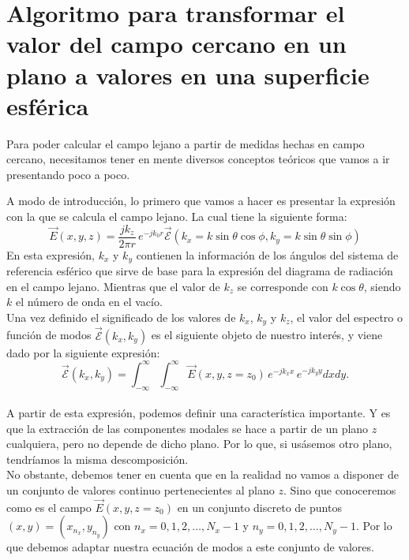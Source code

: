 \documentclass{article}
\begin{document}
\section{Algoritmo para transformar el valor del campo cercano en un
plano a valores en una superficie esférica}

Para poder calcular el campo lejano a partir de medidas hechas en campo cercano, necesitamos tener en mente diversos conceptos teóricos que vamos a ir presentando poco a poco.

A modo de introducción, lo primero que vamos a hacer es presentar la expresión con la que se calcula el campo lejano. La cual tiene la siguiente forma:
\begin{equation}
\vec{E}(x,y,z)=\frac{jk_{z}}{2\pi r}\,e^{-jk_{0}r}{\vec{\mathcal{E}}}(k_{x}=k \sin\theta \cos\phi,k_{y}= k\sin\theta \sin\phi)
\label{eq-fourier3}
\end{equation}
En esta expresión, $k_{x}$ y $ k_{y}$  contienen la información de los ángulos del sistema de referencia esférico que sirve de base para la expresión del diagrama de radiación en el campo lejano. Mientras que el valor de $k_{z}$ se corresponde con $k \cos\theta$, siendo $k$ el número de onda en el vacío.
\\

Una vez definido el significado de los valores de $k_{x}$, $k_{y}$ y $k_{z}$, el valor del espectro o función de modos ${\vec{\mathcal{E}}}(k_{x},k_{y})$ es el siguiente objeto de nuestro interés, y viene dado por la siguiente expresión:
\begin{equation}
{\vec{\mathcal{E}}}(k_{x},k_{y})=\int_{-\infty}^{\infty}\int_{-\infty}^{\infty}\vec{E}(x,y,z=z_{0})\,e^{-j k_{x}x}\,e^{-jk_{y}y} dx dy.
\label{eq-fourier2}
\end{equation}
 \\
A partir de esta expresión, podemos definir una característica importante. Y es que la extracción de las componentes modales se hace a partir de un plano  $z$ cualquiera, pero no depende de dicho plano.
Por lo que, si usásemos otro plano, tendríamos la misma descomposición.
\\

No obstante, debemos tener en cuenta que en la realidad no vamos a disponer de un conjunto de valores continuo pertenecientes al plano $z$. Sino que  conoceremos como es el campo  $\vec{E}(x,y,z=z_{0})$ en un conjunto discreto de puntos $(x,y) = (x_{n_{x}},y_{n_{y}})$ con   $n_{x}=0,1,2,\ldots,N_{x}-1$ y  $n_{y}=0,1,2,\ldots,N_{y}-1$.
Por lo que debemos adaptar nuestra ecuación de modos a este conjunto de valores.
\end{document}
